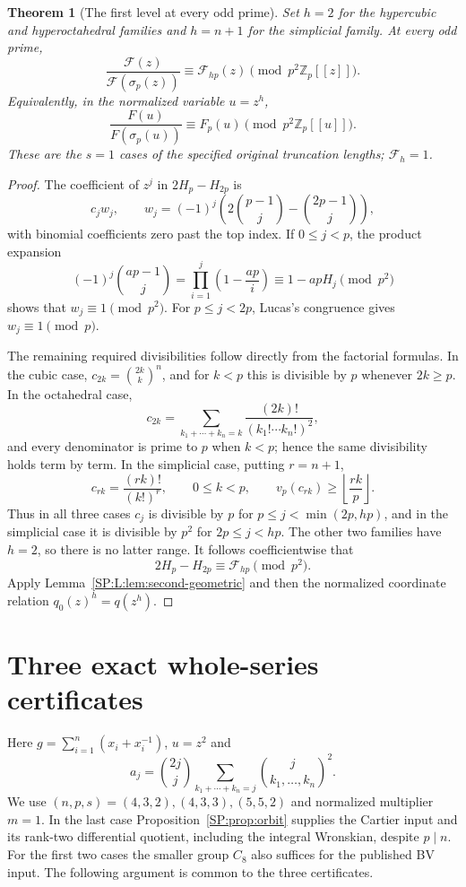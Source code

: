 \documentclass[11pt,a4paper]{article}
\newtheorem{theorem}{Theorem}[section]
\theoremstyle{definition}\newtheorem{definition}[theorem]{Definition}
\theoremstyle{remark}\newtheorem{remark}[theorem]{Remark}
\numberwithin{equation}{section}
\begin{document}
\begin{theorem}[The first level at every odd prime]
\label{SP:L:thm:first-all-dim}
Set \(h=2\) for the hypercubic and hyperoctahedral families and
\(h=n+1\) for the simplicial family.  At every odd prime,
\[
 \frac{\mathcal F(z)}{\mathcal F(\sigma_p(z))}
 \equiv\mathcal F_{hp}(z)\pmod{p^2\mathbb Z_p[[z]]}.
\]
Equivalently, in the normalized variable \(u=z^h\),
\[
 \frac{F(u)}{F(\sigma_p(u))}
 \equiv F_p(u)\pmod{p^2\mathbb Z_p[[u]]}.
\]
These are the \(s=1\) cases of the specified original truncation
lengths; \(\mathcal F_h=1\).
\end{theorem}

\begin{proof}
The coefficient of \(z^j\) in \(2H_p-H_{2p}\) is
\[
 c_jw_j,\qquad
 w_j=(-1)^j\left(2\binom{p-1}{j}-\binom{2p-1}{j}\right),
\]
with binomial coefficients zero past the top index.  If \(0\leq j<p\),
the product expansion
\[
 (-1)^j\binom{ap-1}{j}
 =\prod_{i=1}^j\left(1-\frac{ap}{i}\right)
 \equiv1-apH_j\pmod{p^2}
\]
shows that \(w_j\equiv1\pmod{p^2}\).
For \(p\leq j<2p\), Lucas's congruence gives
\(w_j\equiv1\pmod p\).

The remaining required divisibilities follow directly from the
factorial formulas.  In the cubic case,
\(c_{2k}=\binom{2k}{k}^n\), and for \(k<p\) this is divisible by
\(p\) whenever \(2k\geq p\).
In the octahedral case,
\[
 c_{2k}=\sum_{k_1+\cdots+k_n=k}
              \frac{(2k)!}{(k_1!\cdots k_n!)^2},
\]
and every denominator is prime to \(p\) when \(k<p\); hence the
same divisibility holds term by term.
In the simplicial case, putting \(r=n+1\),
\[
 c_{rk}=\frac{(rk)!}{(k!)^r},\qquad 0\leq k<p,
 \qquad v_p(c_{rk})\geq\left\lfloor\frac{rk}{p}\right\rfloor.
\]
Thus in all three cases \(c_j\) is divisible by \(p\) for
\(p\leq j<\min(2p,hp)\), and in the simplicial case it is divisible
by \(p^2\) for \(2p\leq j<hp\).  The other two families have
\(h=2\), so there is no latter range.
It follows coefficientwise that
\[
 2H_p-H_{2p}\equiv\mathcal F_{hp}\pmod{p^2}.
\]
Apply Lemma~\ref{SP:L:lem:second-geometric} and then the normalized
coordinate relation \(q_0(z)^h=q(z^h)\).
\end{proof}


\section{Three exact whole-series certificates}\label{SP:source-main-5}
Here $g=\sum_{i=1}^n(x_i+x_i^{-1})$, $u=z^2$ and
\[
a_j=\binom{2j}{j}
\sum_{k_1+\cdots+k_n=j}\binom{j}{k_1,\ldots,k_n}^{\!2}.
\]
We use $(n,p,s)=(4,3,2),(4,3,3),(5,5,2)$ and normalized multiplier
$m=1$. In the last case Proposition~\ref{SP:prop:orbit} supplies the
Cartier input and its rank-two differential quotient, including the
integral Wronskian, despite $p\mid n$. For the first two cases the
smaller group $C_8$ also suffices for the published BV input.
The following argument is common to the three certificates.
\end{document}
